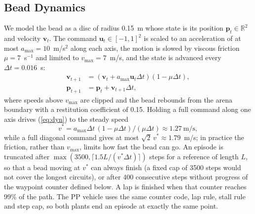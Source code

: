 \documentclass[conference]{IEEEtran}
\begin{document}
\subsection{Bead Dynamics}\label{sec:dyn}
We model the bead as a disc of radius 0.15~m whose state is its position $\mathbf{p}_t\in\mathbb{R}^2$ and velocity $\mathbf{v}_t$. The command $\mathbf{u}_t\in[-1,1]^2$ is scaled to an acceleration of at most $a_{\max}=10$~m/s$^2$ along each axis, the motion is slowed by viscous friction $\mu=7$~s$^{-1}$ and limited to $v_{\max}=7$~m/s, and the state is advanced every $\Delta t=0.016$~s:
\begin{equation}
\begin{aligned}
\mathbf{v}_{t+1}&=(\mathbf{v}_t+a_{\max}\mathbf{u}_t\Delta t)(1-\mu\Delta t),\\
\mathbf{p}_{t+1}&=\mathbf{p}_t+\mathbf{v}_{t+1}\Delta t,
\end{aligned}\label{eq:dyn}
\end{equation}
where speeds above $v_{\max}$ are clipped and the bead rebounds from the arena boundary with a restitution coefficient of 0.15. Holding a full command along one axis drives (\ref{eq:dyn}) to the steady speed
\begin{equation}
v^{*}=a_{\max}\Delta t\,(1-\mu\Delta t)/(\mu\Delta t)\approx1.27~\text{m/s},\label{eq:vstar}
\end{equation}
while a full diagonal command gives at most $\sqrt2\,v^{*}\approx1.79$~m/s; in practice the friction, rather than $v_{\max}$, limits how fast the bead can go. An episode is truncated after $\max(3500,\lceil1.5L/(v^{*}\Delta t)\rceil)$ steps for a reference of length $L$, so that a bead moving at $v^{*}$ can always finish (a fixed cap of 3500 steps would not cover the longest circuits), or after 400 consecutive steps without progress of the waypoint counter defined below. A lap is finished when that counter reaches 99\% of the path. The PP vehicle uses the same counter code, lap rule, stall rule and step cap, so both plants end an episode at exactly the same point.
\end{document}
